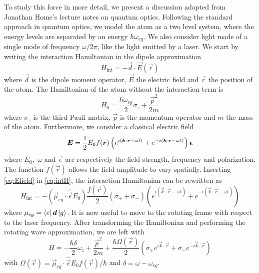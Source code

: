 To study this force in more detail, we present a discussion adapted from Jonathan Home's lecture notes on quantum optics. Following the standard approach in quantum optics, we model the atom as a two level system, where the energy levels are separated by an energy $\hbar \omega_{eg}$. We also consider light made of a single mode of frequency $\omega / 2\pi$, like the light emitted by a laser. We start by writing the interaction Hamiltonian in the dipole approximation
\begin{equation}
    \label{eq:intH}
    H_\text{int} = -\vec{d} \cdot \vec{E}(\vec{r})
\end{equation}
where $\vec{d}$ is the dipole moment operator, $\vec{E}$ the electric field and $\vec{r}$ the position of the atom. The Hamiltonian of the atom without the interaction term is
\begin{equation}
    H_0 = \frac{\hbar \omega_{eg}}{2} \sigma_z + \frac{\vec
        {p}^2}{2m}
\end{equation}
where $\sigma_z$ is the third Pauli matrix, $\vec{p}$ is the momentum operator and $m$ the mass of the atom.
Furthermore, we consider a classical electric field
\begin{equation}
    \label{eq:Efield}
    \mathbf{\boldsymbol{E}} = \frac{1}{2} E_0 f(\mathbf{\boldsymbol{r}} ) \left(e^{i( \mathbf{\boldsymbol{k}}\cdot\mathbf{\boldsymbol{r}} - \omega t)} + e^{-i( \mathbf{\boldsymbol{k}}\cdot\mathbf{\boldsymbol{r}} - \omega t)}  \right) \mathbf{\boldsymbol{\epsilon}}
\end{equation}
where $E_0,$ $\omega$ and $\vec{\epsilon}$ are respectively the field strength, frequency and polarization. The function $f(\vec{r})$ allows the field amplitude to vary spatially. Inserting \cref{eq:Efield} in \cref{eq:intH}, the interaction Hamiltonian can be rewritten as
\begin{equation}
    H_\text{int} = -(\vec{\mu}_{eg} \cdot \hat{\vec{\epsilon}} E_0) \frac{f(\vec{r})}{2} (\sigma_+ + \sigma_{-}) \left(e^{i( \vec{k}\cdot\vec{r} - \omega t)} + e^{-i( \vec{k}\cdot\vec{r} - \omega t)}  \right)
\end{equation}
where $\mu_{eg} = \bra{e} \mathbf{\boldsymbol{d}} \ket{g}$. It is now useful to move to the rotating frame with respect to the laser frequency. After transforming the Hamiltonian and performing the rotating wave approximation, we are left with
\begin{equation}
    H = -\frac{\hbar \delta}{2} \omega_z + \frac{\vec{p}^2}{2m} + \frac{\hbar \Omega(\vec
        r)}{2} \left( \sigma_+ e^{i\vec{k}\cdot \vec{r}} +  \sigma_{-} e^{-i\vec{k}\cdot \vec{r} } \right)
\end{equation}
with $\Omega(\vec{r}) = \vec{\mu}_{eg} \cdot \hat{\vec{\epsilon}} E_0 f(\vec{r}) / \hbar$ and $\delta = \omega - \omega_{eg}$.
